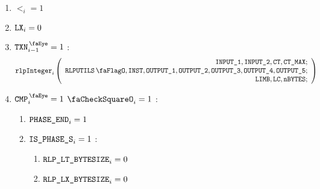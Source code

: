 \begin{center}
\end{center}
\begin{enumerate}
    \item $\lt_{i} =1$
    \item $\texttt{LX}_{i} =0$
    \item \If $\isTxn_{i-1} =1$ \Then:
        \[
            \rlpInteger_{i}
            \left(
            \begin{array}{r}
                \inputColumn{1},
                \inputColumn{2},
                \ct,
                \maxCt; \\
                \rlpUtilsFlag,
                \INST,
                \resultColumn{1},
                \resultColumn{2},
                \resultColumn{3},
                \resultColumn{4},
                \resultColumn{5}; \\
                \limb,
                \lc,
                \limbsize; \\
            \end{array}
            \right)
        \]
    \item \If $\isCmp_{i} =1$ \et $\done_{i}=1$ \Then:
        \begin{enumerate}
            \item $\texttt{PHASE\_END}_{i}=1$
            \item \If $\texttt{IS\_PHASE\_S}_{i}=1$ \Then:
                \begin{enumerate}
                    \item $\texttt{RLP\_LT\_BYTESIZE}_{i} = 0$
                    \item $\texttt{RLP\_LX\_BYTESIZE}_{i} = 0$ 
                \end{enumerate}
        \end{enumerate}
\end{enumerate}

